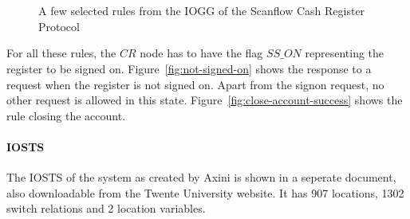 \begin{figure}[ht]
  \begin{center}
    \hspace{20px}
    \\
    \hspace{20px}
    \\
    \hspace{20px}
  \end{center}
  \caption{A few selected rules from the IOGG of the Scanflow Cash Register Protocol}
  \label{fig:gg-scrp}
\end{figure}

For all these rules, the $CR$ node has to have the flag $\mathit{SS\_ON}$ representing the register to be signed on. Figure~\ref{fig:not-signed-on} shows the response to a request when the register is not signed on. Apart from the signon request, no other request is allowed in this state. Figure~\ref{fig:close-account-success} shows the rule closing the account.

\paragraph*{IOSTS} The IOSTS of the system as created by Axini is shown in a seperate document, also downloadable from the Twente University website\footnotemark[\value{footnote}]. It has 907 locations, 1302 switch relations and 2 location variables.